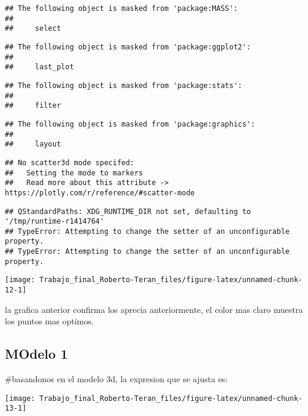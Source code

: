 \documentclass[
]{article}
\begin{document}
\begin{verbatim}
## The following object is masked from 'package:MASS':
## 
##     select
\end{verbatim}

\begin{verbatim}
## The following object is masked from 'package:ggplot2':
## 
##     last_plot
\end{verbatim}

\begin{verbatim}
## The following object is masked from 'package:stats':
## 
##     filter
\end{verbatim}

\begin{verbatim}
## The following object is masked from 'package:graphics':
## 
##     layout
\end{verbatim}

\begin{verbatim}
## No scatter3d mode specifed:
##   Setting the mode to markers
##   Read more about this attribute -> https://plotly.com/r/reference/#scatter-mode
\end{verbatim}

\begin{verbatim}
## QStandardPaths: XDG_RUNTIME_DIR not set, defaulting to '/tmp/runtime-r1414764'
## TypeError: Attempting to change the setter of an unconfigurable property.
## TypeError: Attempting to change the setter of an unconfigurable property.
\end{verbatim}

\begin{center}\texttt{[image: Trabajo\_final\_Roberto-Teran\_files/figure-latex/unnamed-chunk-12-1]} \end{center}

la grafica anterior confirma los aprecia anteriormente, el color mas
claro muestra los puntos mas optimos.

\hypertarget{modelo-1}{%
\subsection{MOdelo 1}\label{modelo-1}}

\#basandonos en el modelo 3d, la expresion que se ajusta es:

\begin{center}\texttt{[image: Trabajo\_final\_Roberto-Teran\_files/figure-latex/unnamed-chunk-13-1]} \end{center}
\end{document}
